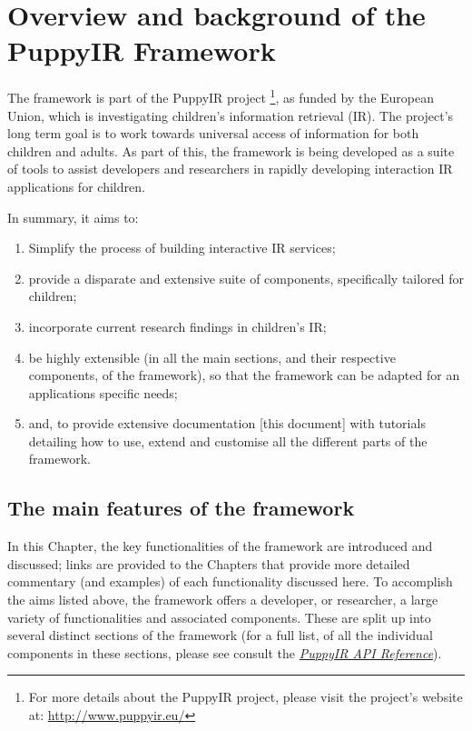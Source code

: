 \documentclass[letterpaper,10pt,english]{sphinxmanual}
\begin{document}
\section{Overview and background of the PuppyIR Framework}
\label{overview:overview}\label{overview::doc}\label{overview:overview-and-background-of-the-puppyir-framework}
The framework is part of the PuppyIR project \footnote{
For more details about the PuppyIR project, please visit the project's website at: \href{http://www.puppyir.eu/}{http://www.puppyir.eu/}
}, as funded by the European Union, which is investigating children's information retrieval (IR). The project's long term goal is to work towards universal access of information for both children and adults. As part of this, the framework is being developed as a suite of tools to assist developers and researchers in rapidly developing interaction IR applications for children.

In summary, it aims to:
\begin{enumerate}
\item {} 
Simplify the process of building interactive IR services;

\item {} 
provide a disparate and extensive suite of components, specifically tailored for children;

\item {} 
incorporate current research findings in children's IR;

\item {} 
be highly extensible (in all the main sections, and their respective components, of the framework), so that the framework can be adapted for an applications specific needs;

\item {} 
and, to provide extensive documentation {[}this document{]} with tutorials detailing how to use, extend and customise all the different parts of the framework.

\end{enumerate}


\subsection{The main features of the framework}
\label{overview:the-main-features-of-the-framework}
In this Chapter, the key functionalities of the framework are introduced and discussed; links are provided to the Chapters that provide more detailed commentary (and examples) of each functionality discussed here. To accomplish the aims listed above, the framework offers a developer, or researcher, a large variety of functionalities and associated components. These are split up into several distinct sections of the framework (for a full list, of all the individual components in these sections, please see consult the {\hyperref[api3.0:api]{\emph{PuppyIR API Reference}}}).
\end{document}
